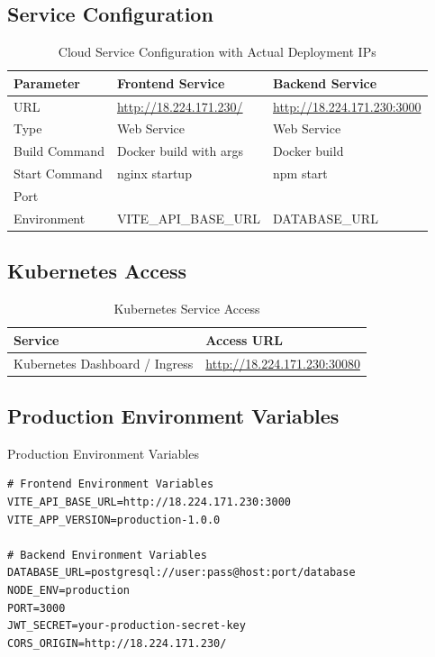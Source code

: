 \documentclass[12pt]{article}
\begin{document}
\subsection{Service Configuration}
\begin{table}[ht!]
\centering
\begin{tabular}{|l|>{\raggedright\arraybackslash}p{6cm}|>{\raggedright\arraybackslash}p{6cm}|}
\hline
\rowcolor{lightblue}
\textbf{Parameter} & \textbf{Frontend Service} & \textbf{Backend Service} \\
\hline
URL & \url{http://18.224.171.230/} & \url{http://18.224.171.230:3000} \\
Type & Web Service & Web Service \\
Build Command & Docker build with args & Docker build \\
Start Command & nginx startup & npm start \\
Port & 80 & 3000 \\
Environment & VITE\_API\_BASE\_URL & DATABASE\_URL \\
\hline
\end{tabular}
\caption{Cloud Service Configuration with Actual Deployment IPs}
\end{table}

\subsection{Kubernetes Access}
\begin{table}[ht!]
\centering
\begin{tabular}{|l|l|}
\hline
\rowcolor{lightblue}
\textbf{Service} & \textbf{Access URL} \\
\hline
Kubernetes Dashboard / Ingress & \url{http://18.224.171.230:30080} \\
\hline
\end{tabular}
\caption{Kubernetes Service Access}
\end{table}

\subsection{Production Environment Variables}
\begin{codebox}{Production Environment Variables}
\begin{lstlisting}
# Frontend Environment Variables
VITE_API_BASE_URL=http://18.224.171.230:3000
VITE_APP_VERSION=production-1.0.0

# Backend Environment Variables
DATABASE_URL=postgresql://user:pass@host:port/database
NODE_ENV=production
PORT=3000
JWT_SECRET=your-production-secret-key
CORS_ORIGIN=http://18.224.171.230/
\end{lstlisting}
\end{codebox}
\end{document}

